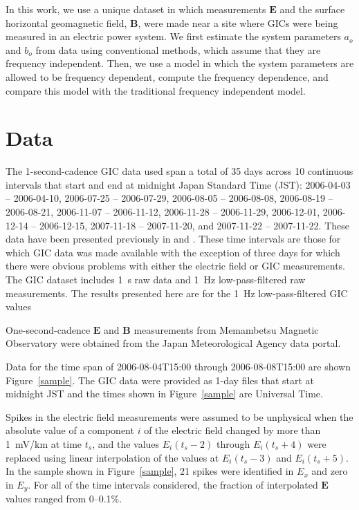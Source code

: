 \documentclass[draft,linenumbers]{agujournal2018}
\begin{document}
In this work, we use a unique dataset in which measurements $\mathbf{E}$ and the surface horizontal geomagnetic field, $\mathbf{B}$, were made near a site where GICs were being measured in an electric power system.  We first estimate the system parameters $a_o$ and $b_o$ from data using conventional methods, which assume that they are frequency independent. Then, we use a model in which the system parameters are allowed to be frequency dependent, compute the frequency dependence, and compare this model with the traditional frequency independent model. 

\section{Data}

The 1-second-cadence GIC data used span a total of 35 days across 10 continuous intervals that start and end at midnight Japan Standard Time (JST): 2006-04-03 -- 2006-04-10, 2006-07-25 -- 2006-07-29, 2006-08-05 -- 2006-08-08, 2006-08-19 -- 2006-08-21, 2006-11-07 -- 2006-11-12, 2006-11-28 -- 2006-11-29, 2006-12-01, 2006-12-14 -- 2006-12-15, 2007-11-18 -- 2007-11-20, and 2007-11-22 -- 2007-11-22. These data have been presented previously in \citet{Watari2009} and \cite{Watari2015}. These time intervals are those for which GIC data was made available with the exception of three days for which there were obvious problems with either the electric field or GIC measurements. The GIC dataset includes 1~s raw data and 1~Hz low-pass-filtered raw measurements. The results presented here are for the 1~Hz low-pass-filtered GIC values

One-second-cadence $\mathbf{E}$ and $\mathbf{B}$ measurements from Memambetsu Magnetic Observatory were obtained from the Japan Meteorological Agency data portal.

Data for the time span of 2006-08-04T15:00 through 2006-08-08T15:00 are shown Figure~\ref{sample}. The GIC data were provided as 1-day files that start at midnight JST and the times shown in Figure~\ref{sample} are Universal Time.

Spikes in the electric field measurements were assumed to be unphysical when the absolute value of a component $i$ of the electric field changed by more than 1~mV/km at time $t_s$, and the values $E_i(t_s-2)$ through $E_i(t_s+4)$ were replaced using linear interpolation of the values at $E_i(t_s-3)$ and $E_i(t_s + 5)$. In the sample shown in Figure~\ref{sample}, 21 spikes were identified in $E_x$ and zero in $E_y$. For all of the time intervals considered, the fraction of interpolated $\mathbf{E}$ values ranged from 0--0.1\%.
\end{document}
